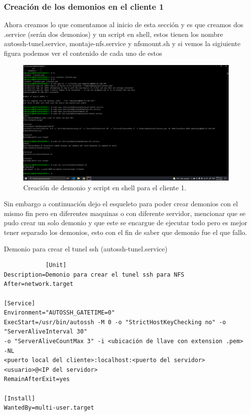 \documentclass[11pt]{article}
\begin{document}
		\subsubsection{Creación de los demonios en el cliente 1 }
		Ahora creamos lo que comentamos al inicio de esta sección y es que creamos dos .service (serán dos demonios) y un script en shell, estos tienen los nombre autossh-tunel.service, montaje-nfs.service y nfsmount.sh y si vemos la sigiuiente figura podemos ver el contenido de cada uno de estos
		\begin{figure}[H]
			\centering
			\includegraphics[scale=0.34]{resources/demonioc1.png}
			\caption{Creación de demonio y script en shell para el cliente 1.}\label{fig:picture}
		\end{figure}
		Sin embargo a continuación dejo el esqueleto para poder crear demonios con el mismo fin pero en diferentes maquinas o con diferente servidor, mencionar que se pudo crear un solo demonio y que este se encargue de ejecutar todo pero es mejor tener separado los demonios, esto con el fin de saber que demonio fue el que fallo.\par
		Demonio para crear el tunel ssh (autossh-tunel.service)
		\begin{verbatim}
			[Unit]
Description=Demonio para crear el tunel ssh para NFS
After=network.target

[Service]
Environment="AUTOSSH_GATETIME=0"
ExecStart=/usr/bin/autossh -M 0 -o "StrictHostKeyChecking no" -o "ServerAliveInterval 30" 
-o "ServerAliveCountMax 3" -i <ubicación de llave con extension .pem> -NL 
<puerto local del cliente>:localhost:<puerto del servidor> <usuario>@<IP del servidor>
RemainAfterExit=yes

[Install]
WantedBy=multi-user.target

		\end{verbatim}
\end{document}

